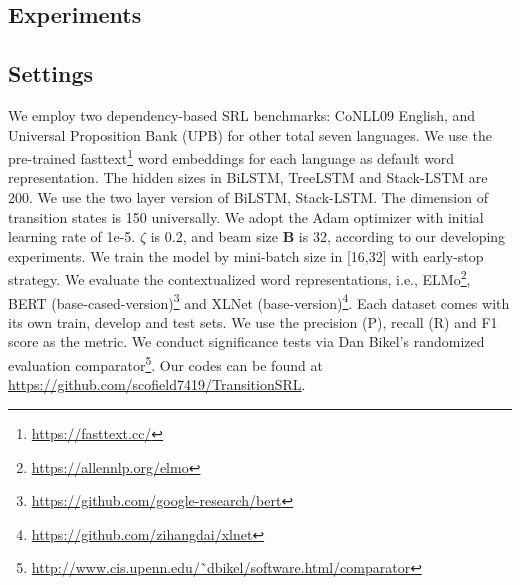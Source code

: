 \documentclass[letterpaper]{article} %
\begin{document}
\begin{CJK}{UTF8}{gbsn}
\section{Experiments}



\subsection{Settings}

We employ two dependency-based SRL benchmarks: CoNLL09 English, and Universal Proposition Bank (UPB) for other total seven languages.
We use the pre-trained fasttext\footnote{\url{https://fasttext.cc/}} word embeddings for each language as default word representation.
The hidden sizes in BiLSTM, TreeLSTM and Stack-LSTM are 200.
We use the two layer version of BiLSTM, Stack-LSTM.
The dimension of transition states is 150 universally.
We adopt the Adam optimizer with initial learning rate of 1e-5.
$\zeta$ is 0.2, and beam size \textbf{B} is 32, according to our developing experiments.
We train the model by mini-batch size in [16,32] with early-stop strategy.
We evaluate the contextualized word representations, i.e., ELMo\footnote{\url{https://allennlp.org/elmo}}, BERT (base-cased-version)\footnote{\url{https://github.com/google-research/bert}} and XLNet (base-version)\footnote{\url{https://github.com/zihangdai/xlnet}}.
Each dataset comes with its own train, develop and test sets.
We use the precision (P), recall (R) and F1 score as the metric.
We conduct significance tests via Dan Bikel’s randomized evaluation comparator\footnote{\url{http://www.cis.upenn.edu/˜dbikel/software.html/comparator}}.
Our codes can be found at \url{https://github.com/scofield7419/TransitionSRL}.







\end{CJK}
\end{document}
